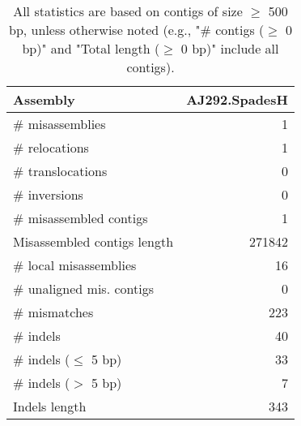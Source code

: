 \documentclass[12pt,a4paper]{article}
\begin{document}
\begin{table}[ht]
\begin{center}
\caption{All statistics are based on contigs of size $\geq$ 500 bp, unless otherwise noted (e.g., "\# contigs ($\geq$ 0 bp)" and "Total length ($\geq$ 0 bp)" include all contigs).}
\begin{tabular}{|l*{1}{|r}|}
\hline
Assembly & AJ292.SpadesH \\ \hline
\# misassemblies & 1 \\ \hline
\hspace{5mm}\# relocations & 1 \\ \hline
\hspace{5mm}\# translocations & 0 \\ \hline
\hspace{5mm}\# inversions & 0 \\ \hline
\# misassembled contigs & 1 \\ \hline
Misassembled contigs length & 271842 \\ \hline
\# local misassemblies & 16 \\ \hline
\# unaligned mis. contigs & 0 \\ \hline
\# mismatches & 223 \\ \hline
\# indels & 40 \\ \hline
\hspace{5mm}\# indels ($\leq$ 5 bp) & 33 \\ \hline
\hspace{5mm}\# indels ($>$ 5 bp) & 7 \\ \hline
Indels length & 343 \\ \hline
\end{tabular}
\end{center}
\end{table}
\end{document}
